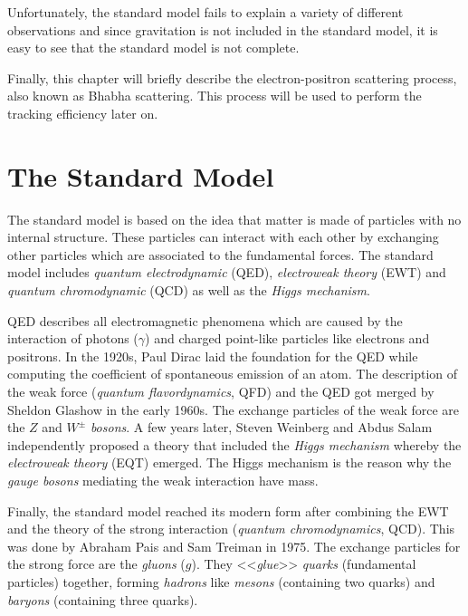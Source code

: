 \documentclass[a4paper,11pt,twosided,final,german,openbib,pdftex,listof=totoc,bibliography=totoc]{scrbook}
\begin{document}
 Unfortunately, the standard model fails to explain a variety of different observations and since gravitation is not included in the standard model, it is easy to see that the standard model is not complete.
 
 
 Finally, this chapter will briefly describe the electron-positron scattering process, also known as Bhabha scattering. This process will be used to perform the tracking efficiency later on.
 
 
\section{The Standard Model}
\label{sec:SM}

The standard model is based on the idea that matter is made of particles with no internal structure. These particles can interact with each other by exchanging other particles which are associated to the fundamental forces. The standard model includes \textit{quantum electrodynamic} (QED), \textit{electroweak theory} (EWT) and \textit{quantum chromodynamic} (QCD) as well as the \textit{Higgs mechanism}.
\newline

QED describes all electromagnetic phenomena which are caused by the interaction of photons ($\gamma$) and charged point-like particles like electrons and positrons. In the 1920s, Paul Dirac laid the foundation for the QED while computing the coefficient of spontaneous emission of an atom. The description of the weak force (\textit{quantum flavordynamics}, QFD) and the QED got merged by Sheldon Glashow in the early 1960s. The exchange particles of the weak force are the $Z$ and $W^{\pm}$ \textit{bosons}. A few years later, Steven Weinberg and Abdus Salam independently proposed a theory that included the \textit{Higgs mechanism} whereby the \textit{electroweak theory} (EQT) emerged. The Higgs mechanism is the reason why the \textit{gauge bosons} mediating the weak interaction have mass.

Finally, the standard model reached its modern form after combining the EWT and the theory of the strong interaction (\textit{quantum chromodynamics}, QCD). This was done by Abraham Pais and Sam Treiman in 1975. The exchange particles for the strong force are the \textit{gluons} ($g$). They <<\textit{glue}>> \textit{quarks} (fundamental particles) together, forming \textit{hadrons} like \textit{mesons} (containing two quarks) and \textit{baryons} (containing three quarks). \cite{RiseStandard}
\end{document}
